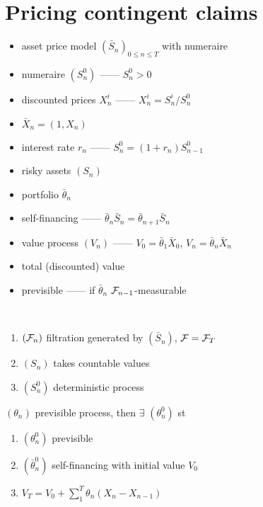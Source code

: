 \section{Pricing contingent claims}\label{sec:pricing-contingent-claims}

\begin{itemize}
    \item asset price model $(\bar S_n)_{0\leq n \leq T}$ with numeraire
    \item numeraire $(S_n^0)$ ------ $S^0_n > 0$
    \item discounted prices $X_n^i$ ------ $X_n^i = S^i_n / S_n^0$
    \item $\bar X_n = (1, X_n)$
    \item interest rate $r_n$ ------ $S_n^0 = (1 + r_n) S^0_{n-1}$
    \item risky assets $(S_n)$
    \item portfolio $\bar \theta_n$
    \item self-financing ------ $\bar \theta_n \bar S_n = \bar \theta_{n+1} \bar S_n$
    \item value process $(V_n)$ ------ $V_0 = \bar \theta_1 \bar X_0$, $V_n = \bar \theta_n \bar X_n$
    \item total (discounted) value
    \item previsible ------ if $\bar \theta_n$ $\mathcal{F}_{n-1}$-measurable
\end{itemize}

\begin{setting}\,
    \begin{enumerate}
        \item $(\mathcal{F}_n)$ filtration generated by $(\bar S_n)$, $\mathcal{F} = \mathcal{F}_T$
        \item $(S_n)$ takes countable values
        \item $(S_n^0)$ deterministic process
    \end{enumerate}
\end{setting}

\begin{prop}
    $(\theta_n)$ previsible process, then $\exists$ $(\theta_n^0)$ st
    \begin{enumerate}
        \item $(\theta_n^0)$ previsible
        \item $(\bar\theta_n^0)$ self-financing with initial value $V_0$
        \item $V_T = V_0 + \sum^T_1 \theta_n(X_n - X_{n-1})$
    \end{enumerate}
\end{prop}


